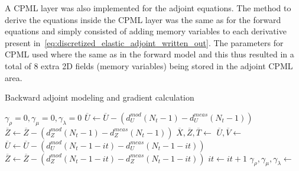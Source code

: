 \documentclass[10pt]{SelfArx} %
\theoremstyle{definition}
\begin{document}
A CPML layer was also implemented for the adjoint equations. The method to derive the equations inside the CPML layer was the same as for the forward equations and simply consisted of adding memory variables to each derivative present in~\cref{eq:discretized_elastic_adjoint_written_out}. The parameters for CPML used where the same as in the forward model and this thus resulted in a total of 8 extra 2D fields (memory variables) being stored in the adjoint CPML area. 

\begin{algorithm}
\caption{Backward adjoint modeling and gradient calculation}\label{alg:adjoint_prop}
\begin{algorithmic}[1]
\State $\gamma_{\rho} = 0, \gamma_{\mu} = 0, \gamma_{\lambda} = 0$ 
\State $\overline{U} \gets \overline U - \left(d^{mod}_U\left(N_t-1\right) - d^{meas}_U\left(N_t-1\right)\right) $ 
\State $\overline{Z} \gets \overline Z - \left(d^{mod}_Z\left(N_t-1\right) - d^{meas}_Z\left(N_t-1\right)\right) $
    \State $\overline X, \overline Z, \overline T \gets $  
    \State $\overline U, \overline V \gets $  
    \State  {}
    \State $\overline{U} \gets \overline U - \left(d^{mod}_U\left(N_t-1-it\right) - d^{meas}_U\left(N_t-1-it\right)\right) $ 
    \State $\overline{Z} \gets \overline Z - \left(d^{mod}_Z\left(N_t-1-it\right) - d^{meas}_Z\left(N_t-1-it\right)\right) $
    \State $it \gets it + 1$
    \State $\gamma_{\rho}, \gamma_{\mu}, \gamma_{\lambda} \gets $ 
    \EndFor
\EndFunction
\end{algorithmic}
\end{algorithm}
\end{document}
